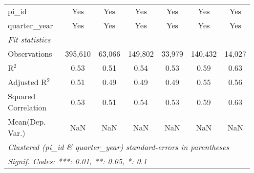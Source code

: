 \begin{tabular}{lcccccc}
   pi\_id                                                     & Yes           & Yes           & Yes           & Yes           & Yes           & Yes\\  
   quarter\_year                                              & Yes           & Yes           & Yes           & Yes           & Yes           & Yes\\  
   \midrule
   \emph{Fit statistics}\\
   Observations                                               & 395,610       & 63,066        & 149,802       & 33,979        & 140,432       & 14,027\\  
   R$^2$                                                      & 0.53          & 0.51          & 0.54          & 0.53          & 0.59          & 0.63\\  
   Adjusted R$^2$                                             & 0.51          & 0.49          & 0.49          & 0.49          & 0.55          & 0.56\\  
   Squared Correlation                                        & 0.53          & 0.51          & 0.54          & 0.53          & 0.59          & 0.63\\  
Mean(Dep. Var.) & NaN & NaN & NaN & NaN & NaN & NaN \\
   \midrule \midrule
   \multicolumn{7}{l}{\emph{Clustered (pi\_id \& quarter\_year) standard-errors in parentheses}}\\
   \multicolumn{7}{l}{\emph{Signif. Codes: ***: 0.01, **: 0.05, *: 0.1}}\\
\end{tabular}
\par\endgroup
